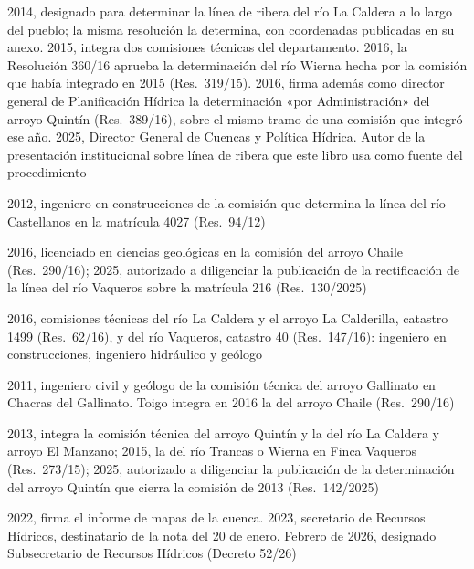 \begin{personas}
\item[{\textbf{Jorge G.\ Torres\index{Torres, Jorge G.}}}] 2014, designado para determinar la línea de ribera del río La Caldera a lo largo del pueblo; la misma resolución la determina, con coordenadas publicadas en su anexo. 2015, integra dos comisiones técnicas del departamento. 2016, la Resolución 360/16 aprueba la determinación del río Wierna hecha por la comisión que había integrado en 2015 (Res.\ 319/15). 2016, firma además como director general de Planificación Hídrica la determinación «por Administración» del arroyo Quintín (Res.\ 389/16), sobre el mismo tramo de una comisión que integró ese año. 2025, Director General de Cuencas y Política Hídrica. Autor de la presentación institucional sobre línea de ribera que este libro usa como fuente del procedimiento

\item[{\textbf{Pablo Vicente Balverdi}}] 2012, ingeniero en construcciones de la comisión que determina la línea del río Castellanos en la matrícula 4027 (Res.\ 94/12)

\item[{\textbf{Enrique Chalabe}}] 2016, licenciado en ciencias geológicas en la comisión del arroyo Chaile (Res.\ 290/16); 2025, autorizado a diligenciar la publicación de la rectificación de la línea del río Vaqueros sobre la matrícula 216 (Res.\ 130/2025)

\item[{\textbf{Rolando Chávez}, \textbf{Víctor Zacarías Pérez} y \textbf{Héctor Saravia Navamuel}}] 2016, comisiones técnicas del río La Caldera y el arroyo La Calderilla, catastro 1499 (Res.\ 62/16), y del río Vaqueros, catastro 40 (Res.\ 147/16): ingeniero en construcciones, ingeniero hidráulico y geólogo

\item[{\textbf{Marcelo Ricardo Toigo} y \textbf{José A.\ Medina}}] 2011, ingeniero civil y geólogo de la comisión técnica del arroyo Gallinato en Chacras del Gallinato. Toigo integra en 2016 la del arroyo Chaile (Res.\ 290/16)

\item[{\textbf{Antonio Alejandro Forns\index{Forns, Antonio Alejandro}}}] 2013, integra la comisión técnica del arroyo Quintín y la del río La Caldera y arroyo El Manzano; 2015, la del río Trancas o Wierna en Finca Vaqueros (Res.\ 273/15); 2025, autorizado a diligenciar la publicación de la determinación del arroyo Quintín que cierra la comisión de 2013 (Res.\ 142/2025)

\item[{\textbf{Mauricio Romero Leal}}] 2022, firma el informe de mapas de la cuenca. 2023, secretario de Recursos Hídricos, destinatario de la nota del 20 de enero. Febrero de 2026, designado Subsecretario de Recursos Hídricos (Decreto 52/26)


\end{personas}

